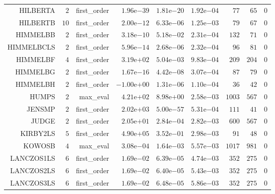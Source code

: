 \begin{longtable}{rrrrrrrrr}
HILBERTA & \(     2\) & first\_order & \( 1.96\)e\(-39\) & \( 1.81\)e\(-20\) & \( 1.92\)e\(-04\) & \(    77\) & \(    65\) & \(     0\) \\
HILBERTB & \(    10\) & first\_order & \( 2.00\)e\(-12\) & \( 6.33\)e\(-06\) & \( 1.25\)e\(-03\) & \(    79\) & \(    67\) & \(     0\) \\
HIMMELBB & \(     2\) & first\_order & \( 3.18\)e\(-10\) & \( 5.18\)e\(-02\) & \( 2.31\)e\(-04\) & \(   132\) & \(    71\) & \(     0\) \\
HIMMELBCLS & \(     2\) & first\_order & \( 5.96\)e\(-14\) & \( 2.68\)e\(-06\) & \( 2.32\)e\(-04\) & \(    96\) & \(    81\) & \(     0\) \\
HIMMELBF & \(     4\) & first\_order & \( 3.19\)e\(+02\) & \( 5.04\)e\(-03\) & \( 9.83\)e\(-04\) & \(   209\) & \(   204\) & \(     0\) \\
HIMMELBG & \(     2\) & first\_order & \( 1.67\)e\(-16\) & \( 4.42\)e\(-08\) & \( 3.07\)e\(-04\) & \(    87\) & \(    79\) & \(     0\) \\
HIMMELBH & \(     2\) & first\_order & \(-1.00\)e\(+00\) & \( 1.31\)e\(-06\) & \( 1.10\)e\(-04\) & \(    36\) & \(    42\) & \(     0\) \\
HUMPS & \(     2\) & max\_eval & \( 4.21\)e\(+02\) & \( 8.98\)e\(+00\) & \( 2.58\)e\(-03\) & \(  1003\) & \(   567\) & \(     0\) \\
JENSMP & \(     2\) & first\_order & \( 2.02\)e\(+03\) & \( 5.00\)e\(-57\) & \( 5.31\)e\(-04\) & \(   111\) & \(    41\) & \(     0\) \\
JUDGE & \(     2\) & first\_order & \( 2.05\)e\(+01\) & \( 2.84\)e\(-04\) & \( 2.82\)e\(-03\) & \(   600\) & \(   567\) & \(     0\) \\
KIRBY2LS & \(     5\) & first\_order & \( 4.90\)e\(+05\) & \( 3.52\)e\(-01\) & \( 2.98\)e\(-03\) & \(    91\) & \(    48\) & \(     0\) \\
KOWOSB & \(     4\) & max\_eval & \( 3.08\)e\(-04\) & \( 1.64\)e\(-03\) & \( 5.57\)e\(-03\) & \(  1017\) & \(   981\) & \(     0\) \\
LANCZOS1LS & \(     6\) & first\_order & \( 1.69\)e\(-02\) & \( 6.39\)e\(-05\) & \( 4.74\)e\(-03\) & \(   352\) & \(   275\) & \(     0\) \\
LANCZOS2LS & \(     6\) & first\_order & \( 1.69\)e\(-02\) & \( 6.40\)e\(-05\) & \( 5.43\)e\(-03\) & \(   352\) & \(   275\) & \(     0\) \\
LANCZOS3LS & \(     6\) & first\_order & \( 1.69\)e\(-02\) & \( 6.48\)e\(-05\) & \( 5.86\)e\(-03\) & \(   352\) & \(   275\) & \(     0\) \\

\end{longtable}
